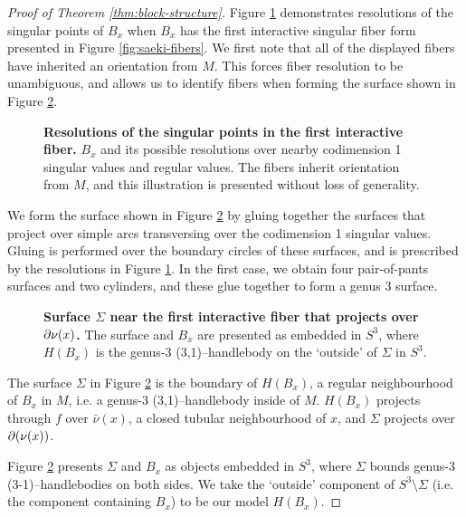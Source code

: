 \begin{proof}[Proof of Theorem \ref{thm:block-structure}]
	Figure \ref{fig:codim-2-interactive-fiber-1} demonstrates resolutions of the singular points of $B_x$ when $B_x$ has the first interactive singular fiber form presented in Figure \ref{fig:saeki-fibers}.
	We first note that all of the displayed fibers have inherited an orientation from $M$.
	This forces fiber resolution to be unambiguous, and allows us to identify fibers when forming the surface shown in Figure \ref{fig:codim-2-surface-1}.
	
	\begin{figure}[h!]
		\caption{
			\textbf{Resolutions of the singular points in the first interactive fiber.}
			$B_x$ and its possible resolutions over nearby codimension 1 singular values and regular values.
			The fibers inherit orientation from $M$, and this illustration is presented without loss of generality.
		}
		\label{fig:codim-2-interactive-fiber-1}
	\end{figure}

	We form the surface shown in Figure \ref{fig:codim-2-surface-1} by gluing together the surfaces that project over simple arcs transversing over the codimension 1 singular values.
	Gluing is performed over the boundary circles of these surfaces, and is prescribed by the resolutions in Figure \ref{fig:codim-2-interactive-fiber-1}.
	In the first case, we obtain four pair-of-pants surfaces and two cylinders, and these glue together to form a genus 3 surface.
	
	\begin{figure}[h!]
		\caption{
			\textbf{Surface $\Sigma$ near the first interactive fiber that projects over $\partial\nu(x)$.}
			The surface and $B_x$ are presented as embedded in $S^3$, where $H(B_x)$ is the genus-3 (3,1)--handlebody on the `outside' of $\Sigma$ in $S^3$.
		}
		\label{fig:codim-2-surface-1}
	\end{figure}
	
	The surface $\Sigma$ in Figure \ref{fig:codim-2-surface-1} is the boundary of $H(B_x)$, a regular neighbourhood of $B_x$ in $M$, i.e. a genus-3 (3,1)--handlebody inside of $M$.
	$H(B_x)$ projects through $f$ over $\bar\nu(x)$, a closed tubular neighbourhood of $x$, and $\Sigma$ projects over $\partial(\nu(x))$.
	
	Figure \ref{fig:codim-2-surface-1} presents $\Sigma$ and $B_x$ as objects embedded in $S^3$, where $\Sigma$ bounds genus-3 (3-1)--handlebodies on both sides.
	We take the `outside' component of $S^3\setminus\Sigma$ (i.e. the component containing $B_x$) to be our model $H(B_x)$.
	

\end{proof}
